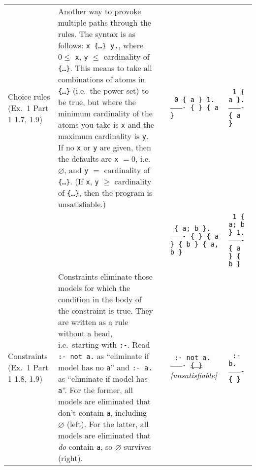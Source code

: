 \documentclass[10pt,a4paper,landscape]{article}
\begin{document}
\begin{longtable}{Lp{13.5cm}lXX}
	Choice rules \newline (Ex.\ 1 Part 1  1.7, 1.9)
		& Another way to provoke multiple paths through the rules.
		The syntax is as follows: \newline \texttt{x \{\ldots \} y.}, where $0 \leq$ \texttt{x}, \texttt{y} $\leq$ cardinality of \texttt{\{\ldots \}}. 
		This means to take all combinations of atoms in \texttt{\{\ldots \}} (i.e.\ the power set) to be true, but where the minimum cardinality of the atoms you take is \texttt{x} and the maximum cardinality is \texttt{y}. 
		If no \texttt{x} or \texttt{y} are given, then the defaults are \texttt{x} $ = 0$, i.e.\ $\varnothing$, and \texttt{y} $=$ cardinality of \texttt{\{\ldots \}}.
		(If \texttt{x}, \texttt{y} $\geq$ cardinality of \texttt{\{\ldots \}}, then the program is unsatisfiable.)
		&& \texttt{%
			0 \{ a \} 1. \newline
			---------- \newline
			\{ \} \newline
			\{ a \} }
		& \texttt{%
			1 \{ a \}. \newline
			---------- \newline
			\{ a \} }\\
		
		&&& \texttt{%
			\{ a; b \}. \newline
			---------- \newline
			\{ \} \newline
			\{ a \} \newline
			\{ b \} \newline
			\{ a, b \} }
		& \texttt{%
			1 \{ a; b \} 1. \newline
			---------- \newline
			\{ a \} \newline
			\{ b \} }\\ \midrule
		
	Constraints \newline (Ex.\ 1 Part 1  1.8, 1.9)
		& Constraints eliminate those models for which the condition in the body of the constraint is true.
		They are written as a rule without a head, i.e.\ starting with \texttt{:-}.
		Read \texttt{:- not a.} as ``eliminate if model has no \texttt{a}'' and \texttt{:- a.} as ``eliminate if model has \texttt{a}''.
		For the former, all models are eliminated that don't contain \texttt{a}, including $\varnothing$ (left).
		For the latter, all models are eliminated that \textit{do} contain \texttt{a}, so $\varnothing$ survives (right).

		&& \texttt{%
			:- not a. \newline
			---------- \newline
			\sout{\{ \}}} \newline		
			\textit{[unsatisfiable]}
		& \texttt{%
			:- b. \newline
			---------- \newline
			\{ \} } \\
			

\end{longtable}
\end{document}
